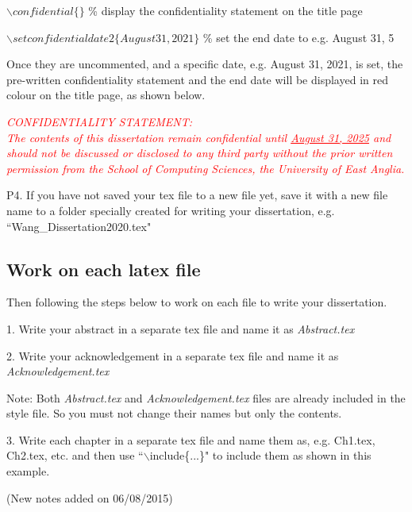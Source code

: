  $\backslash confidential\{\}$   	\% display the confidentiality statement on the title page  
 
 $\backslash setconfidentialdate2\{August 31, 2021\} $	\% set the end date to e.g. August 31, 5

Once they are uncommented, and a specific date, e.g. August 31, 2021, is set, the pre-written confidentiality statement and the end date will be displayed in red colour on the title page, as shown below.
  
\textcolor {red} {	
	{\emph{CONFIDENTIALITY STATEMENT:\\ 
		The contents of this dissertation remain confidential until \underline{August 31, 2025}
		and should not be discussed or disclosed to any third party without the prior written permission 
		from the School of Computing Sciences, the University of East Anglia.}}}


P4. If you have not saved your tex file to a new file yet, save it with a new file name to a folder specially created for writing your dissertation, e.g. ``Wang\_Dissertation2020.tex" 


\subsection{Work on each latex file}
		
Then following the steps below to work on each file to write your dissertation.    

 1. Write your abstract in a separate tex file and name it as \emph{Abstract.tex}
 
 2. Write your acknowledgement in a separate tex file and name it as \emph{Acknowledgement.tex}
   
 Note: Both \emph{Abstract.tex} and \emph{Acknowledgement.tex} files are already included in the style file.
 So you must not change their names but only the contents.    

 3. Write each chapter in a separate tex file and name them as, e.g. Ch1.tex, Ch2.tex, etc. 
 and then use ``$\backslash$include\{...\}" to include them as shown in this example.
 
(New notes added on 06/08/2015)

